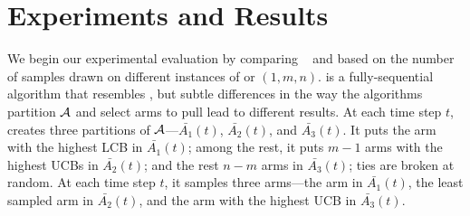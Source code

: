 \section{Experiments and Results}
\label{sec:expt}
We begin our experimental evaluation by comparing  \FF~\cite{bib:arcsk2017} and \GLUCB based on the number
of samples drawn on different instances of \QF or $(1, m, n)$. \FF is a fully-sequential algorithm that resembles \GLUCB, but subtle differences in the way the algorithms partition $\mathcal{A}$ and select arms to pull lead to different results. At each time step $t$, \FF creates three partitions of $\mathcal{A}$---$\bar{A_1}(t)$, $\bar{A_{2}}(t)$, and $\bar{A_{3}}(t)$.
It puts the arm with the highest LCB in $\bar{A_1}(t)$; among
the rest, it puts $m-1$ arms with the highest UCBs in $\bar{A_2}(t)$; and the rest $n-m$ arms in $\bar{A_3}(t)$; ties are broken at random. At each time step $t$, it 
samples three arms---the arm in $\bar{A_1}(t)$, the least sampled arm in $\bar{A_2}(t)$, and the arm with the highest UCB in $\bar{A_3}(t)$.


